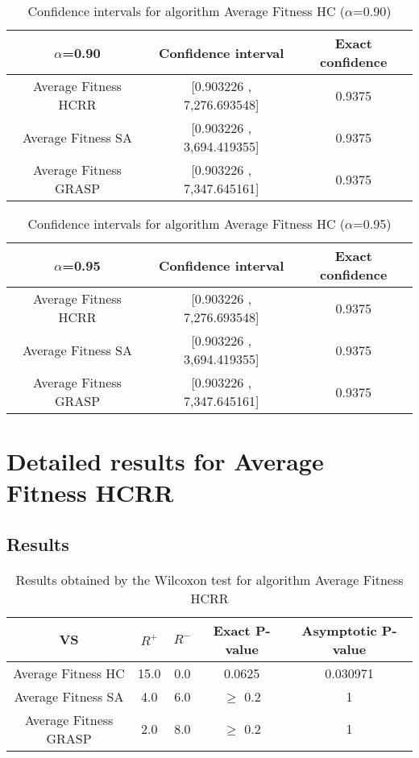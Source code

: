 \documentclass[a4paper,10pt]{article}
\begin{document}
\begin{table}[!htp]
\centering\small
\begin{tabular}{
|c|c|c|}
\hline
 $\alpha$=0.90 & Confidence interval & Exact confidence \\ \hline 
Average Fitness HCRR & [0.903226 , 7,276.693548] & 0.9375\\ \hline 
Average Fitness SA & [0.903226 , 3,694.419355] & 0.9375\\ \hline 
Average Fitness GRASP & [0.903226 , 7,347.645161] & 0.9375\\ \hline 

\end{tabular}
\caption{Confidence intervals for algorithm Average Fitness HC ($\alpha$=0.90)}
\end{table}
\begin{table}[!htp]
\centering\small
\begin{tabular}{
|c|c|c|}
\hline
 $\alpha$=0.95 & Confidence interval & Exact confidence \\ \hline 
Average Fitness HCRR & [0.903226 , 7,276.693548] & 0.9375\\ \hline 
Average Fitness SA & [0.903226 , 3,694.419355] & 0.9375\\ \hline 
Average Fitness GRASP & [0.903226 , 7,347.645161] & 0.9375\\ \hline 

\end{tabular}
\caption{Confidence intervals for algorithm Average Fitness HC ($\alpha$=0.95)}
\end{table}

 \clearpage 


\section{Detailed results for Average Fitness HCRR}


\subsection{Results}

\begin{table}[!htp]
\centering\small
\begin{tabular}{
|c|c|c|c|c|}
\hline
 VS & $R^{+}$ & $R^{-}$ & Exact P-value & Asymptotic P-value \\ \hline 
Average Fitness HC & 15.0 & 0.0 & 0.0625 & 0.030971\\ \hline 
Average Fitness SA & 4.0 & 6.0 & $\geq$ 0.2 & 1\\ \hline 
Average Fitness GRASP & 2.0 & 8.0 & $\geq$ 0.2 & 1\\ \hline 

\end{tabular}
\caption{Results obtained by the Wilcoxon test for algorithm Average Fitness HCRR}
\end{table}
\end{document}
